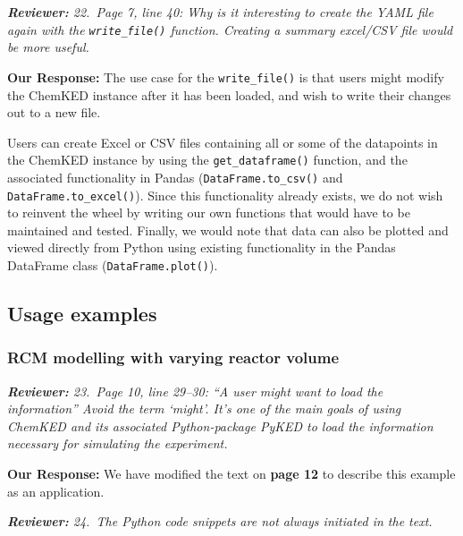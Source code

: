 \documentclass[a4paper,10pt]{elsarticle}
\newenvironment{reviewer}{\vspace{0.5\baselineskip}\begingroup\itshape\textbf{Reviewer:}}{\endgroup}
\newenvironment{response}{\textbf{Our Response:}}{\vspace{0.5\baselineskip}}
\begin{document}
\begin{reviewer}
    22.~Page 7, line 40: Why is it interesting to create the YAML file again with the
    \texttt{write\_file()} function. Creating a summary excel/CSV file would be more useful.
\end{reviewer}

\begin{response}
    The use case for the \texttt{write\_file()} is that users might modify the ChemKED instance
    after it has been loaded, and wish to write their changes out to a new file.

    Users can create Excel or CSV files containing all or some of the datapoints in the ChemKED
    instance by using the \verb|get_dataframe()| function, and the associated functionality in
    Pandas (\verb|DataFrame.to_csv()| and \verb|DataFrame.to_excel()|). Since this functionality
    already exists, we do not wish to reinvent the wheel by writing our own functions that would
    have to be maintained and tested. Finally, we would note that data can also be plotted and
    viewed directly from Python using existing functionality in the Pandas DataFrame class
    (\verb|DataFrame.plot()|).
\end{response}

\subsection*{Usage examples}
\subsubsection*{RCM modelling with varying reactor volume}

\begin{reviewer}
    23.~Page 10, line 29--30: ``A user might want to load the information'' Avoid the term `might'.
    It's one of the main goals of using ChemKED and its associated Python-package PyKED to load the
    information necessary for simulating the experiment.
\end{reviewer}

\begin{response}
    We have modified the text on \textbf{page 12} to describe this example as an application.
\end{response}

\begin{reviewer}
    24.~The Python code snippets are not always initiated in the text.
\end{reviewer}
\end{document}
